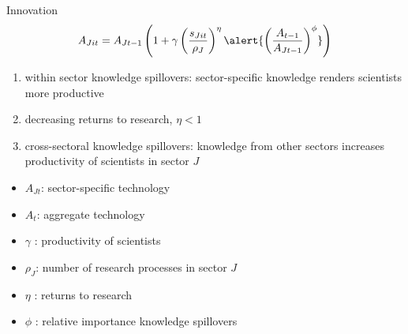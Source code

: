 \documentclass[11pt,aspectratio=169]{beamer}
\begin{document}
\addtocounter{framenumber}{-1}
\begin{frame}{Innovation}
	\large
	\begin{align*}
		A_{Jit}={A_{Jt-1}}\left(1+\gamma\left(\frac{s_{Jit}}{\rho_J}\right)^\eta\alert{\left(\frac{A_{t-1}}{A_{Jt-1}}\right)^\phi}\right)
	\end{align*}
	\normalsize
	\begin{enumerate}
		\item within sector knowledge spillovers: sector-specific knowledge renders scientists more productive
		\item decreasing returns to research, $\eta<1$
		\item \alert{cross-sectoral knowledge spillovers: knowledge from other sectors increases productivity of scientists in sector $J$} \footnotesize{\citep{Barbieri2021GreenPolicy}}
	\end{enumerate}
	\small
	\vspace{4mm}
	\hspace{-2mm}
	\begin{minipage}[t!]{0.43\textwidth}
		\vspace{0mm}
		\begin{itemize}
			\item[] $A_{Jt}$: sector-specific technology
			\vspace{-2mm}		
			\item[] $A_t$: aggregate technology 
			\vspace{-2mm}
			\item[] $\gamma$ : productivity of scientists
		\end{itemize}
	\end{minipage}
	\vspace{-5mm}
	\begin{minipage}[t!]{0.55\textwidth}
		\vspace{0mm}
		\begin{itemize}	
			\item[] $\rho_J$: number of research processes in sector $J$
			\vspace{-2mm}			
			\item[] $\eta$ : returns to research
			\vspace{-2mm}			
			\item[] $\phi$ : relative importance knowledge spillovers
		\end{itemize}
	\end{minipage}
\end{frame}
\end{document}
